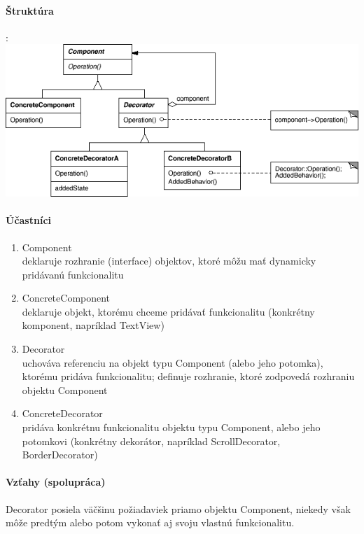 		\paragraph{Štruktúra}:\\


		\includegraphics[width=.9\textwidth]{images/programovanie/decorator2}
		
		\paragraph{Účastníci}
			\begin{enumerate}
				\item Component\\
				deklaruje rozhranie (interface) objektov, ktoré môžu mať dynamicky pridávanú funkcionalitu
				\item ConcreteComponent\\
				deklaruje objekt, ktorému chceme pridávať funkcionalitu (konkrétny komponent, napríklad TextView)
				\item Decorator\\
				uchováva referenciu na objekt typu Component (alebo jeho potomka), ktorému pridáva funkcionalitu; definuje rozhranie, ktoré zodpovedá rozhraniu objektu Component
				\item ConcreteDecorator\\
				pridáva konkrétnu funkcionalitu objektu typu Component, alebo jeho potomkovi (konkrétny dekorátor, napríklad ScrollDecorator, BorderDecorator)
			\end{enumerate}
		
		\paragraph{Vzťahy (spolupráca)}
		Decorator posiela väčšinu požiadaviek priamo objektu Component, niekedy však môže predtým alebo potom vykonať aj svoju vlastnú funkcionalitu.

